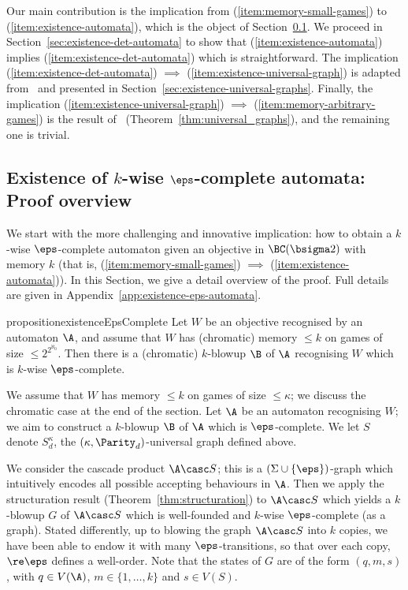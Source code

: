 Our main contribution is the implication from (\ref{item:memory-small-games}) to (\ref{item:existence-automata}), which is the object of Section~\ref{sec:existence_automata}.
We proceed in Section~\ref{sec:existence-det-automata} to show that (\ref{item:existence-automata}) implies (\ref{item:existence-det-automata}) which is straightforward.
The implication (\ref{item:existence-det-automata}) $\implies$ (\ref{item:existence-universal-graph}) is adapted from~\cite{CO24Positional} and presented in Section~\ref{sec:existence-universal-graphs}.
Finally, the implication (\ref{item:existence-universal-graph}) $\implies$ (\ref{item:memory-arbitrary-games}) is the result of~\cite{CO25LMCS} (Theorem~\ref{thm:universal_graphs}), and the remaining one is trivial.

\subsection{Existence of $k$-wise $\eps$-complete automata: Proof overview}\label{sec:existence_automata}

We start with the more challenging and innovative implication: how to obtain a $k$-wise $\eps$-complete automaton given an objective in $\BC(\bsigma 2)$ with memory $k$ (that is, (\ref{item:memory-small-games}) $\implies$ (\ref{item:existence-automata})).
In this Section, we give a detail overview of the proof. 
Full details are given in Appendix~\ref{app:existence-eps-automata}.

\begin{restatable}{proposition}{existenceEpsComplete}
    \label{prop:existenceEpsComplete}
    Let $W$ be an objective recognised by an automaton $\A$, and assume that $W$ has (chromatic) memory $\leq k$ on games of size $\leq 2^{2^{\aleph_0}}$.
    Then there is a (chromatic) $k$-blowup $\B$ of $\A$ recognising $W$ which is $k$-wise $\eps$-complete.
\end{restatable}

We assume that $W$ has memory $\leq k$ on games of size $\leq \kappa$; we discuss the chromatic case at the end of the section.
Let $\A$ be an automaton recognising $W$; we aim to construct a $k$-blowup $\B$ of $\A$ which is $\eps$-complete.
We let $S$ denote $S^\kappa_d$, the $(\kappa,\Parity_{d})$-universal graph defined above.


We consider the cascade product $\A \casc S$; this is a $(\Sigma \cup \{\eps\})$-graph which intuitively encodes all possible accepting behaviours in $\A$.
Then we apply the structuration result (Theorem~\ref{thm:structuration}) to $\A \casc S$ which yields a $k$-blowup $G$ of $\A \casc S$ which is well-founded and $k$-wise $\eps$-complete (as a graph).
Stated differently, up to blowing the graph $\A \casc S$ into $k$ copies, we have been able to endow it with many $\eps$-transitions, so that over each copy, $\re \eps$ defines a well-order.
Note that the states of $G$ are of the form $(q,m,s)$, with $q\in V(\A)$, $m\in\{1,\dots,k\}$ and $s\in V(S)$.

